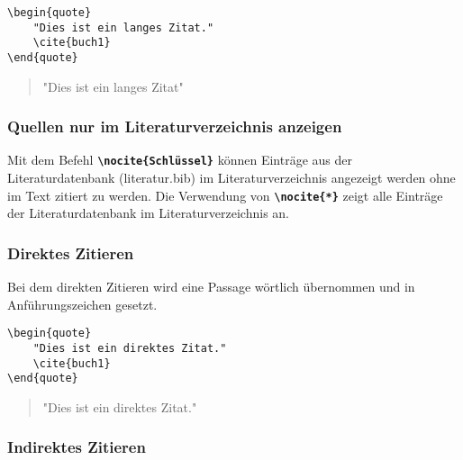 \begin{minipage}[c]{0.48\textwidth}
    \begin{lstlisting}[language={[LaTeX]TeX}]
\begin{quote}
    "Dies ist ein langes Zitat."
    \cite{buch1}
\end{quote}
    \end{lstlisting}
\end{minipage}
\hfill
\begin{minipage}[c]{0.48\textwidth}
    \begin{quote}
        "Dies ist ein langes Zitat"
        \cite{buch1}
    \end{quote}
\end{minipage}

\subsubsection{Quellen nur im Literaturverzeichnis anzeigen}
Mit dem Befehl \textbf{\texttt{\textbackslash nocite\{Schlüssel\}}} können Einträge aus der Literaturdatenbank (literatur.bib) im Literaturverzeichnis angezeigt werden ohne im Text zitiert zu werden.
Die Verwendung von \textbf{\texttt{\textbackslash nocite\{*\}}} zeigt alle Einträge der Literaturdatenbank im Literaturverzeichnis an.

\subsubsection{Direktes Zitieren}
Bei dem direkten Zitieren wird eine Passage wörtlich übernommen und in Anführungszeichen gesetzt.

\begin{minipage}[c]{0.48\textwidth}
    \begin{lstlisting}[language={[LaTeX]TeX}]
\begin{quote}
    "Dies ist ein direktes Zitat."
    \cite{buch1}
\end{quote}
    \end{lstlisting}
\end{minipage}
\hfill
\begin{minipage}[c]{0.48\textwidth}
    \begin{quote}
        "Dies ist ein direktes Zitat."
        \cite{buch1}
    \end{quote}
\end{minipage}

\subsubsection{Indirektes Zitieren}




